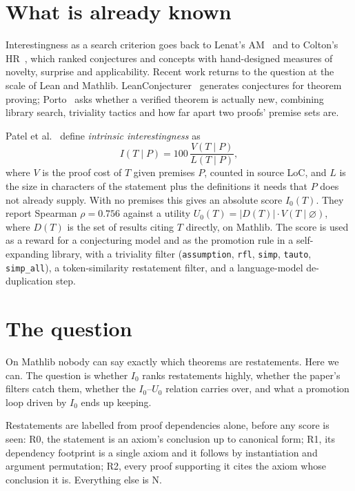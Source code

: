 \documentclass[11pt,a4paper]{article}
\newcommand{\Iz}{I_0}
\newcommand{\Uz}{U_0}
\begin{document}
\section{What is already known}

Interestingness as a search criterion goes back to Lenat's AM~\cite{lenat} and
to Colton's HR~\cite{colton}, which ranked conjectures and concepts with
hand-designed measures of novelty, surprise and applicability. Recent work
returns to the question at the scale of Lean and Mathlib.
LeanConjecturer~\cite{leanconjecturer} generates conjectures for theorem
proving; Porto~\cite{porto} asks whether a verified theorem is actually new,
combining library search, triviality tactics and how far apart two proofs' premise sets are.

Patel et al.~\cite{patel} define \emph{intrinsic interestingness} as
\[
  I(T\mid P) = 100\,\frac{V(T\mid P)}{L(T\mid P)},
\]
where $V$ is the proof cost of $T$ given premises $P$, counted in source LoC,
and $L$ is the size in characters of the statement plus the definitions
it needs that $P$ does not already supply. With no premises this gives an
absolute score $\Iz(T)$. They report Spearman $\rho = 0.756$ against a utility
$\Uz(T) = |D(T)|\cdot V(T\mid\varnothing)$, where $D(T)$ is the set of results
citing $T$ directly, on Mathlib. The score is used as a reward for a conjecturing
model and as the promotion rule in a self-expanding library, with a triviality
filter (\texttt{assumption}, \texttt{rfl}, \texttt{simp}, \texttt{tauto},
\texttt{simp\_all}), a token-similarity restatement filter, and a language-model
de-duplication step.

\section{The question}

On Mathlib nobody can say exactly which theorems are restatements. Here we
can. The question is whether $\Iz$ ranks restatements highly, whether the
paper's filters catch them, whether the $\Iz$--$\Uz$ relation carries over, and
what a promotion loop driven by $\Iz$ ends up keeping.

Restatements are labelled from proof dependencies alone, before any score is
seen: R0, the statement is an axiom's conclusion up to canonical form; R1, its
dependency footprint is a single axiom and it follows by instantiation and
argument permutation; R2, every proof supporting it cites the axiom whose
conclusion it is. Everything else is N.
\end{document}

